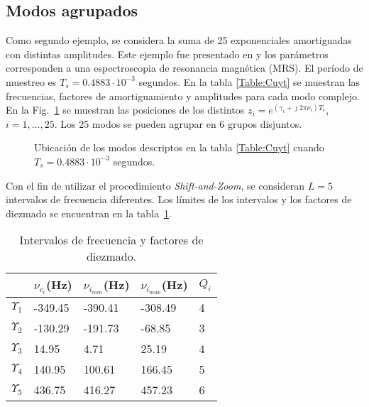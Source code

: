 		\subsection{Modos agrupados}
		
			Como segundo ejemplo, se considera la suma de 25 exponenciales amortiguadas con distintas amplitudes. Este ejemplo fue presentado en \cite{Cuyt2018} y los parámetros corresponden a una espectroscopia de resonancia magnética (MRS). El período de muestreo es $T_s = 0.4883\cdot 10^{-3}$ segundos. En la tabla \ref{Table:Cuyt} se muestran las frecuencias, factores de amortiguamiento y amplitudes para cada modo complejo. En la Fig.~\ref{Fig:loc_ava} se muestran las posiciones de los distintos $z_i = e^{(\gamma_i+\jmath 2\pi\nu_i)T_s}$, $i =1,\ldots,25$. Los 25 modos se pueden agrupar en 6 grupos disjuntos.	
			
			\begin{figure}[t]
				\centering
				
				\caption{Ubicación de los modos descriptos en la tabla \ref{Table:Cuyt} cuando $T_s = 0.4883\cdot 10^{-3}$ segundos.}
				\label{Fig:loc_ava}		
			\end{figure}
			
			
			Con el fin de utilizar el procedimiento \emph{Shift-and-Zoom}, se consideran $L=5$ intervalos de frecuencia diferentes. Los límites de los intervalos y los factores de diezmado se encuentran en la tabla~\ref{Table:segments2}.  
		
			
			\begin{table}[t]
				\centering
				\begin{tabular}{lllll}
				 & $\nu_{c_i}$(Hz)       & $\nu_{i_{min}}$(Hz)      & $\nu_{i_{max}}$(Hz) & $Q_i$\\ 
				 \hline
				 
				$\Upsilon_1$   & -349.45 & -390.41  & -308.49 & 4 \\ 
				$\Upsilon_2$   & -130.29 & -191.73  & -68.85  & 3 \\ 
				$\Upsilon_3$   & 14.95   &  4.71    & 25.19   & 4 \\ 
				$\Upsilon_{4}$   & 140.95  & 100.61   & 166.45  & 5 \\ 
				$\Upsilon_5$   & 436.75  & 416.27   & 457.23  & 6 \\ 
				\hline
				\end{tabular}
			\caption{Intervalos de frecuencia y factores de diezmado.}\label{Table:segments2}
			\end{table}
			

